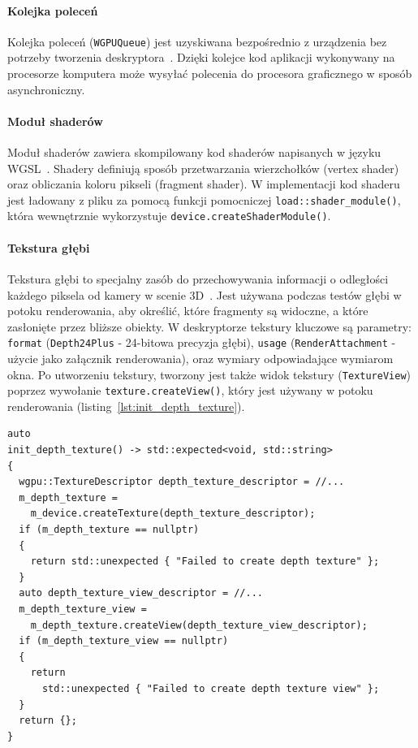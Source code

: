 \paragraph{Kolejka poleceń}
Kolejka poleceń (\texttt{WGPUQueue}) jest uzyskiwana bezpośrednio z urządzenia bez potrzeby tworzenia deskryptora~\cite{WebGPU-draft}. Dzięki kolejce kod aplikacji wykonywany na procesorze komputera może wysyłać polecenia do procesora graficznego w sposób asynchroniczny.

\paragraph{Moduł shaderów}
Moduł shaderów zawiera skompilowany kod shaderów napisanych w języku WGSL~\cite{WebGPU-draft}. Shadery definiują sposób przetwarzania wierzchołków (vertex shader) oraz obliczania koloru pikseli (fragment shader). W implementacji kod shaderu jest ładowany z pliku za pomocą funkcji pomocniczej \texttt{load::shader\_module()}, która wewnętrznie wykorzystuje \texttt{device.createShaderModule()}.

\paragraph{Tekstura głębi}
Tekstura głębi to specjalny zasób do przechowywania informacji o odległości każdego piksela od kamery w scenie 3D~\cite{WebGPU-draft}. Jest używana podczas testów głębi w potoku renderowania, aby określić, które fragmenty są widoczne, a które zasłonięte przez bliższe obiekty. W deskryptorze tekstury kluczowe są parametry: \texttt{format} (\texttt{Depth24Plus} - 24-bitowa precyzja głębi), \texttt{usage} (\texttt{RenderAttachment} - użycie jako załącznik renderowania), oraz wymiary odpowiadające wymiarom okna. Po utworzeniu tekstury, tworzony jest także widok tekstury (\texttt{TextureView}) poprzez wywołanie \texttt{texture.createView()}, który jest używany w potoku renderowania (listing~\ref{lst:init_depth_texture}).
\begin{lstlisting}[caption={Funkcja inicjalizująca obiekt depth texture}, label={lst:init_depth_texture}]
auto
init_depth_texture() -> std::expected<void, std::string>
{
  wgpu::TextureDescriptor depth_texture_descriptor = //...
  m_depth_texture = 
    m_device.createTexture(depth_texture_descriptor);
  if (m_depth_texture == nullptr)
  {
    return std::unexpected { "Failed to create depth texture" };
  }
  auto depth_texture_view_descriptor = //...
  m_depth_texture_view =
    m_depth_texture.createView(depth_texture_view_descriptor);
  if (m_depth_texture_view == nullptr)
  {
    return 
      std::unexpected { "Failed to create depth texture view" };
  }
  return {};
}
\end{lstlisting}

